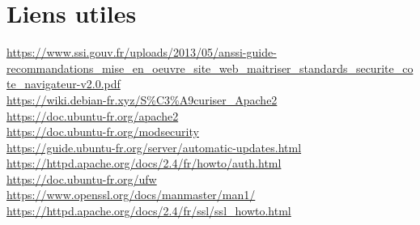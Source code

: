 \section{Liens utiles}
\url{https://www.ssi.gouv.fr/uploads/2013/05/anssi-guide-recommandations_mise_en_oeuvre_site_web_maitriser_standards_securite_cote_navigateur-v2.0.pdf} \\
\url{https://wiki.debian-fr.xyz/S\%C3\%A9curiser_Apache2}\\
\url{https://doc.ubuntu-fr.org/apache2} \\
\url{https://doc.ubuntu-fr.org/modsecurity}\\
\url{https://guide.ubuntu-fr.org/server/automatic-updates.html}\\
\url{https://httpd.apache.org/docs/2.4/fr/howto/auth.html} \\
\url{https://doc.ubuntu-fr.org/ufw}\\
\url{https://www.openssl.org/docs/manmaster/man1/}\\
\url{https://httpd.apache.org/docs/2.4/fr/ssl/ssl_howto.html}
